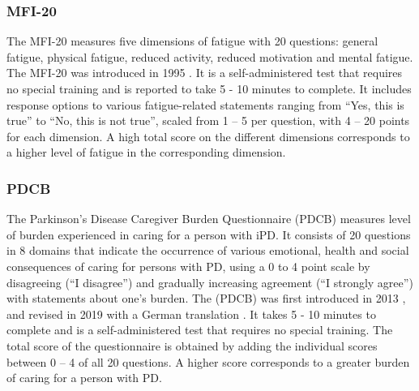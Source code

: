 \subsubsection{\acf{MFI-20}}
\label{questionnaires:MFI20}
The \acl{MFI-20} measures five dimensions of fatigue with 20 questions: general fatigue, physical fatigue, reduced activity, reduced motivation and mental fatigue. The \acs{MFI-20} was introduced in 1995 \cite{smets1995mfi20}. It is a self-administered test that requires no special training and is reported to take 5 - 10 minutes to complete. It includes response options to various fatigue-related statements ranging from ``Yes, this is true'' to ``No, this is not true'', scaled from 1 -- 5 per question, with 4 -- 20 points for each dimension. A high total score on the different dimensions corresponds to a higher level of fatigue in the corresponding dimension.

\QPsychometrics{}

\subsubsection{\acf{PDCB}}
\label{questionnaires:PDCB}
The Parkinson's Disease Caregiver Burden Questionnaire (\acs{PDCB}) measures level of burden experienced in caring for a person with \ac{iPD}. It consists of 20 questions in 8 domains that indicate the occurrence of various emotional, health and social consequences of caring for persons with \ac{PD}, using a 0 to 4 point scale by disagreeing (``I disagree'') and gradually increasing agreement (``I strongly agree'') with statements about one's burden. The (\acs{PDCB}) was first introduced in 2013 \cite{zhong2013pdcb}, and revised in 2019 with a German translation \cite{klietz2019pdcb}. It takes 5 - 10 minutes to complete and is a self-administered test that requires no special training. The total score of the questionnaire is obtained by adding the individual scores between 0 -- 4 of all 20 questions. A higher score corresponds to a greater burden of caring for a person with \ac{PD}.

\QPsychometrics{}

